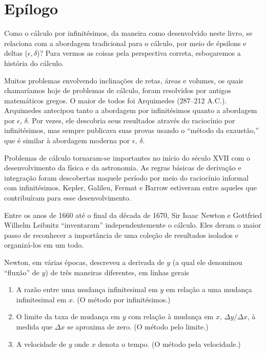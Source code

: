 \graphicspath{ {./figuras/98_epilogue/} }
\chapter*{Epílogo}

\setcounter{chapter}{5}%
\renewcommand{\thechapter}{\Alph{chapter}}%
\renewcommand{\thefigure}{\thechapter.\arabic{figure}}


Como o cálculo por infinitésimos, da maneira como desenvolvido neste livro,
se relaciona com a abordagem tradicional para o cálculo, por meio de
épsilons e deltas ($\epsilon, \delta$)?
Para vermos as coisas pela perspectiva correta,
esboçaremos a história do cálculo.

Muitos problemas envolvendo inclinações de retas, áreas e volumes, os quais
chamaríamos hoje de problemas de cálculo, foram resolvidos por antigos
matemáticos gregos. O maior de todos foi Arquimedes (287--212 A.C.).
Arquimedes antecipou tanto a abordagem por infinitésimos quanto a
abordagem por $\epsilon$, $\delta$. Por vezes, ele descobria seus resultados
através do raciocínio por infinitésimos, mas sempre publicava suas provas
usando o ``método da exaustão,'' que é similar à abordagem moderna por
$\epsilon$, $\delta$.

Problemas de cálculo tornaram-se importantes no início do século
XVII com o desenvolvimento da física e da astronomia. As regras
básicas de derivação e integração foram descobertas naquele período
por meio do raciocínio informal com infinitésimos. Kepler, Galileu,
Fermat e Barrow estiveram entre aqueles que contribuíram para esse
desenvolvimento.

Entre os anos de 1660 até o final da década de 1670, Sir Isaac Newton e
Gottfried Wilhelm Leibnitz ``inventaram'' independentemente o cálculo.
Eles deram o maior passo de reconhecer a importância de uma coleção
de resultados isolados e organizá-los em um todo.

Newton, em várias épocas, descreveu a derivada de $y$ (a qual ele
denominou ``fluxão'' de $y$) de
três maneiras diferentes, em linhas gerais
\begin{enumerate}[(1)]
\item A razão entre uma mudança infinitesimal em $y$ em relação a
      uma mudança infinitesimal em $x$. (O método por infinitésimos.)
\item O limite da taxa de mudança em $y$ com relação à mudança em $x$,
      $\Delta y / \Delta x$, à medida que $\Delta x$ se aproxima de
      zero. (O método pelo limite.)
\item A velocidade de $y$ onde $x$ denota o tempo. (O método pela
      velocidade.)
\end{enumerate}

